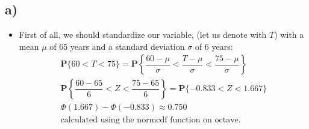 \documentclass[12pt]{article}
\begin{document}
\subsection*{a)}
\begin{itemize}
    \item First of all, we should standardize our variable, (let us denote with $T$) with a mean $\mu$ of 65 years and a standard deviation $\sigma$ of 6 years:
    \begin{equation*}
        \begin{split}
            \textbf{P}\{60 < T < 75\} = \textbf{P}\left\{\dfrac{60-\mu}{\sigma} < \dfrac{T-\mu}{\sigma} < \dfrac{75-\mu}{\sigma} \right\} \\
            \textbf{P}\left\{\dfrac{60-65}{6} < Z < \dfrac{75-65}{6} \right\} = \textbf{P}\{-0.833 < Z < 1.667\}\\
            \Phi(1.667) - \Phi(-0.833) \approx 0.750 \\
            \text{calculated using the normcdf function on octave.}
        \end{split}
     \end{equation*}
\end{itemize} 
\end{document}
